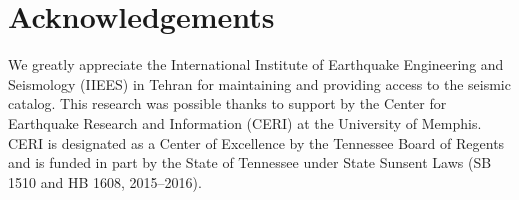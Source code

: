 
\section{Acknowledgements}
\noindent
We greatly appreciate the International Institute of Earthquake Engineering and Seismology (IIEES) in Tehran for maintaining and providing access to the seismic catalog. This research was possible thanks to support by the Center for Earthquake Research and Information (CERI) at the University of Memphis. CERI is designated as a Center of Excellence by the Tennessee Board of Regents and is funded in part by the State of Tennessee under State Sunsent Laws (SB 1510 and HB 1608, 2015--2016).